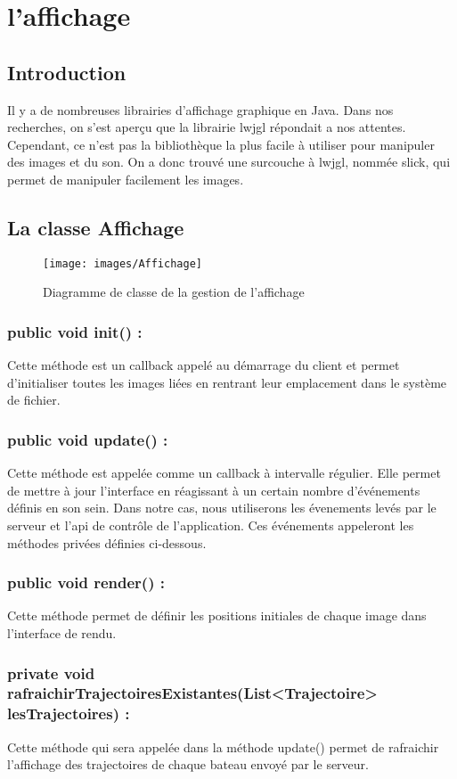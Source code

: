 \section{l'affichage}
\subsection{Introduction}
Il y a de nombreuses librairies d'affichage graphique en Java. Dans nos
recherches, on s'est aperçu que la librairie lwjgl répondait a nos
attentes. Cependant, ce n'est pas la bibliothèque la plus facile à
utiliser pour manipuler des images et du son. On a donc trouvé une
surcouche à lwjgl, nommée slick, qui permet de manipuler facilement les
images.

\subsection{La classe Affichage}
\begin{figure}[h]
	\begin{center}
		\texttt{[image: images/Affichage]}
	\end{center}
	\caption{Diagramme de classe de la gestion de l'affichage}
	\label{fig:partieAffichage}
\end{figure}
\subsubsection{public void init() :} Cette méthode est un callback appelé au démarrage du client et permet d'initialiser toutes les images
liées en rentrant leur emplacement dans le système de fichier.
\subsubsection{public void update() :}Cette méthode est appelée comme
un callback à intervalle régulier. Elle permet de mettre à jour
l'interface en réagissant à un certain nombre d'événements définis en
son sein. Dans notre cas, nous utiliserons les évenements levés par le
serveur et l'api de contrôle de l'application. Ces événements
appeleront les méthodes privées définies ci-dessous.
\subsubsection{public void render() :} Cette méthode permet
de définir les positions initiales de chaque image dans l'interface
de rendu.
\subsubsection{private void
  rafraichirTrajectoiresExistantes(List<Trajectoire> lesTrajectoires)
  :}
Cette méthode qui sera appelée dans la méthode update() permet de
rafraichir l'affichage des trajectoires de chaque bateau envoyé par le serveur.

